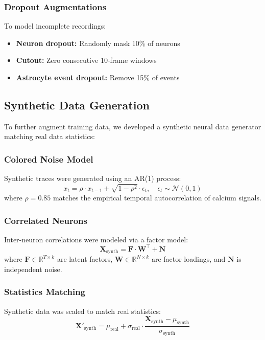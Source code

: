 \documentclass[11pt,twocolumn]{article}
\begin{document}
\subsubsection{Dropout Augmentations}
To model incomplete recordings:
\begin{itemize}
    \item \textbf{Neuron dropout:} Randomly mask 10\% of neurons
    \item \textbf{Cutout:} Zero consecutive 10-frame windows
    \item \textbf{Astrocyte event dropout:} Remove 15\% of events
\end{itemize}

\subsection{Synthetic Data Generation}

To further augment training data, we developed a synthetic neural data generator matching real data statistics:

\subsubsection{Colored Noise Model}
Synthetic traces were generated using an AR(1) process:
\begin{equation}
x_t = \rho \cdot x_{t-1} + \sqrt{1 - \rho^2} \cdot \epsilon_t, \quad \epsilon_t \sim \mathcal{N}(0, 1)
\end{equation}
where $\rho = 0.85$ matches the empirical temporal autocorrelation of calcium signals.

\subsubsection{Correlated Neurons}
Inter-neuron correlations were modeled via a factor model:
\begin{equation}
\mathbf{X}_{\text{synth}} = \mathbf{F} \cdot \mathbf{W}^\top + \mathbf{N}
\end{equation}
where $\mathbf{F} \in \mathbb{R}^{T \times k}$ are latent factors, $\mathbf{W} \in \mathbb{R}^{N \times k}$ are factor loadings, and $\mathbf{N}$ is independent noise.

\subsubsection{Statistics Matching}
Synthetic data was scaled to match real statistics:
\begin{equation}
\mathbf{X}'_{\text{synth}} = \mu_{\text{real}} + \sigma_{\text{real}} \cdot \frac{\mathbf{X}_{\text{synth}} - \mu_{\text{synth}}}{\sigma_{\text{synth}}}
\end{equation}
\end{document}
